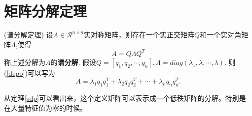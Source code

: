 
	
	\section{矩阵分解定理}
	\begin{theorem}
  (谱分解定理) 设$A \in \mathcal{R}^{n \times n}$实对称矩阵，则存在一个实正交矩阵$Q$和一个实对角矩阵$\Lambda$,使得
  \begin{equation}
    A = Q \Lambda Q^{T}
    \label{depo}
  \end{equation}
  称上述分解为$A$的\textbf{谱分解}. 假设$Q=[q_1,q_2,\cdots,q_n],\Lambda = diag(\lambda_1,\lambda,\cdots,\lambda)$.
  则(\ref{depo})可以写为
  \begin{equation}
    A = \lambda_1 q_1 q_1^T + \lambda_2 q_2 q_2^T + \cdots + \lambda_n q_n q_n^T.  
  \end{equation}
  \label{sdp}
\end{theorem}
\begin{remark}
  从定理\ref{sdp}可以看出来，这个定义矩阵可以表示成一个低秩矩阵的分解。特别是在大量特征值为零的时候。
\end{remark}

	\newpage
	
